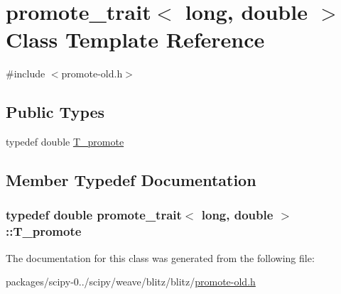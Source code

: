 \hypertarget{classpromote__trait_3_01long_00_01double_01_4}{}\section{promote\+\_\+trait$<$ long, double $>$ Class Template Reference}
\label{classpromote__trait_3_01long_00_01double_01_4}


{\ttfamily \#include $<$promote-\/old.\+h$>$}

\subsection*{Public Types}
\begin{DoxyCompactItemize}
\item 
typedef double \hyperlink{classpromote__trait_3_01long_00_01double_01_4_a63822fadb332b5598e968257325c10d8}{T\+\_\+promote}
\end{DoxyCompactItemize}


\subsection{Member Typedef Documentation}
\hypertarget{classpromote__trait_3_01long_00_01double_01_4_a63822fadb332b5598e968257325c10d8}{}
\subsubsection[{T\+\_\+promote}]{\setlength{\rightskip}{0pt plus 5cm}typedef double {\bf promote\+\_\+trait}$<$ long, double $>$\+::{\bf T\+\_\+promote}}\label{classpromote__trait_3_01long_00_01double_01_4_a63822fadb332b5598e968257325c10d8}


The documentation for this class was generated from the following file\+:\begin{DoxyCompactItemize}
\item 
packages/scipy-\/0../scipy/weave/blitz/blitz/\hyperlink{promote-old_8h}{promote-\/old.\+h}\end{DoxyCompactItemize}
